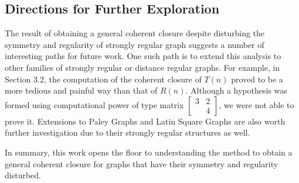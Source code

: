 \subsection{Directions for Further Exploration}
The result of obtaining a general coherent closure despite disturbing the symmetry and regularity of strongly regular graph suggests a number of interesting paths for future work. One such path is to extend this analysis to other families of strongly regular or distance regular graphs. For example, in Section 3.2, the computation of the coherent closure of $T(n)$ proved to be a more tedious and painful way than that of $R(n)$. Although a hypothesis was formed using computational power of type matrix $\begin{bmatrix}3&2\\&4\end{bmatrix}$, we were not able to prove it. Extensions to Paley Graphs and Latin Square Graphs are also worth further investigation due to their strongly regular structures as well.

In summary, this work opens the floor to understanding the method to obtain a general coherent closure for graphs that have their symmetry and regularity disturbed.